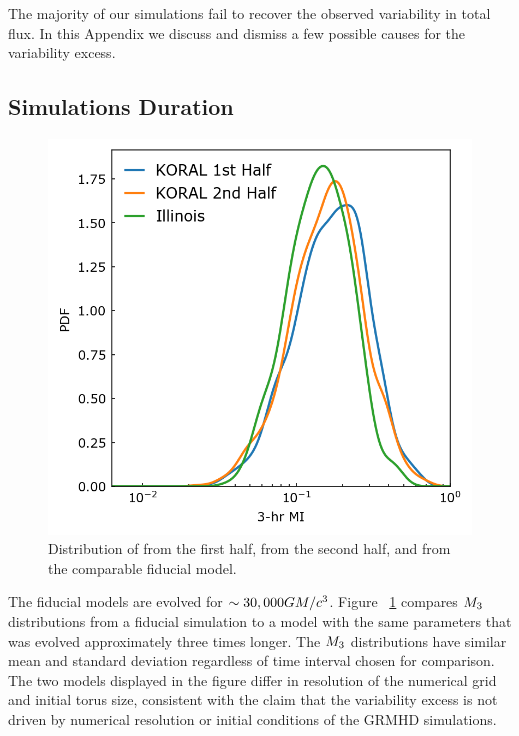 
The majority of our simulations fail to recover the \sgra observed variability in total flux.  In this Appendix we discuss and dismiss a few possible causes for the variability excess.  

\subsection{Simulations Duration}\label{app:narayan}

\begin{figure}
  \centering
  \includegraphics[width=\columnwidth]{./figures/Koral_vs_IL_MI.png}
  \caption{Distribution of  from the \koral first half, from the second half, and from the comparable fiducial \kharma model.}
  \label{fig:koral_MI}
\end{figure}

The fiducial models are evolved for $\sim 30,000 GM/c^3$.  Figure ~\ref{fig:koral_MI} compares $M_{3}$ distributions from a fiducial \kharma simulation to a \koral model with the same parameters that was evolved approximately three times longer. The $M_{3}$ distributions have similar mean and standard deviation regardless of time interval chosen for comparison. The two models displayed in the figure differ in resolution of the numerical grid and initial torus size, consistent with the claim that the variability excess is not driven by numerical resolution or initial conditions of the GRMHD simulations.

